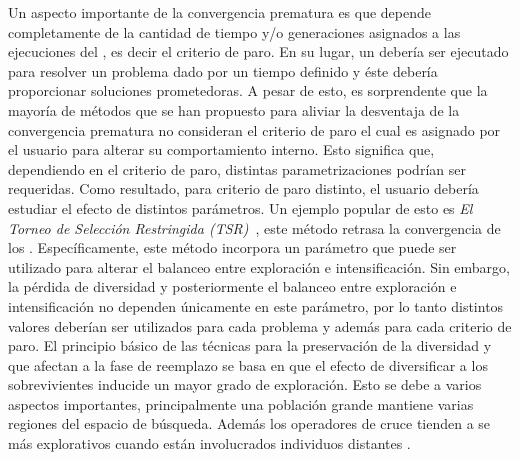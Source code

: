 Un aspecto importante de la convergencia prematura es que depende completamente de la cantidad de tiempo y/o generaciones asignados a las ejecuciones del \EA{}, es decir el criterio de paro.
%
En su lugar, un \EA{} debería ser ejecutado para resolver un problema dado por un tiempo definido y éste debería proporcionar soluciones prometedoras.
%
A pesar de esto, es sorprendente que la mayoría de métodos que se han propuesto para aliviar la desventaja de la convergencia prematura no consideran el criterio de paro el cual es asignado por el usuario para alterar su comportamiento interno.
%
Esto significa que, dependiendo en el criterio de paro, distintas parametrizaciones podrían ser requeridas.
%
Como resultado, para criterio de paro distinto, el usuario debería estudiar el efecto de distintos parámetros.
%
Un ejemplo popular de esto es \textit{El Torneo de Selección Restringida (TSR)}~\cite{Crepinsek:13}, este método retrasa la convergencia de los \EAS{}.
%
Específicamente, este método incorpora un parámetro que puede ser utilizado para alterar el balanceo entre exploración e intensificación.
%
Sin embargo, la pérdida de diversidad y posteriormente el balanceo entre exploración e intensificación no dependen únicamente en este parámetro, por lo tanto distintos valores deberían ser utilizados para cada problema y además para cada criterio de paro.
%
El principio básico de las técnicas para la preservación de la diversidad y que afectan a la fase de reemplazo se basa en que el efecto de diversificar a los sobrevivientes inducide un mayor grado de exploración.
%
Esto se debe a varios aspectos importantes, principalmente una población grande mantiene varias regiones del espacio de búsqueda.
%
Además los operadores de cruce tienden a se más explorativos cuando están involucrados individuos distantes \cite{eiben1998evolutionary}.


